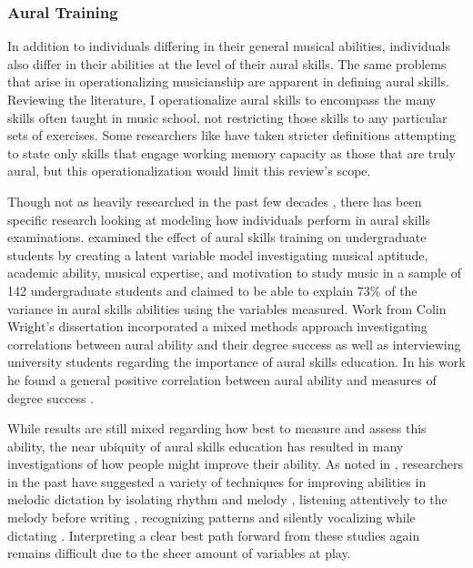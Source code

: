 \documentclass[12pt,]{book}
\begin{document}
\hypertarget{aural-training}{%
\subsubsection{Aural Training}\label{aural-training}}

In addition to individuals differing in their general musical abilities, individuals also differ in their abilities at the level of their aural skills.
The same problems that arise in operationalizing musicianship are apparent in defining aural skills.
Reviewing the literature, I operationalize aural skills to encompass the many skills often taught in music school, not restricting those skills to any particular sets of exercises.
Some researchers like \citet{chenetteReframingAuralSkills2019} have taken stricter definitions attempting to state only skills that engage working memory capacity as those that are truly aural, but this operationalization would limit this review's scope.

Though not as heavily researched in the past few decades \citep{furbyEffectsPeerTutoring2016}, there has been specific research looking at modeling how individuals perform in aural skills examinations.
\citet{harrisonEffectsMusicalAptitude1994} examined the effect of aural skills training on undergraduate students by creating a latent variable model investigating musical aptitude, academic ability, musical expertise, and motivation to study music in a sample of 142 undergraduate students and claimed to be able to explain 73\% of the variance in aural skills abilities using the variables measured.
Work from Colin Wright's dissertation incorporated a mixed methods approach investigating correlations between aural ability and their degree success as well as interviewing university students regarding the importance of aural skills education.
In his work he found a general positive correlation between aural ability and measures of degree success \citep{wrightInvestigatingAuralCase2016}.

While results are still mixed regarding how best to measure and assess this ability, the near ubiquity of aural skills education has resulted in many investigations of how people might improve their ability.
As noted in \citet{furbyEffectsPeerTutoring2016}, researchers in the past have suggested a variety of techniques for improving abilities in melodic dictation by isolating rhythm and melody \citep{bantonRoleVisualAuditory1995, blandSightSingingMelodic1984, rootMethodicalSightSingingLessons1931}, listening attentively to the melody before writing \citep{bantonRoleVisualAuditory1995}, recognizing patterns \citep{bantonRoleVisualAuditory1995, blandSightSingingMelodic1984, rootMethodicalSightSingingLessons1931} and silently vocalizing while dictating \citep{klonoskiImprovingDictationAuralSkills2006}.
Interpreting a clear best path forward from these studies again remains difficult due to the sheer amount of variables at play.
\end{document}
